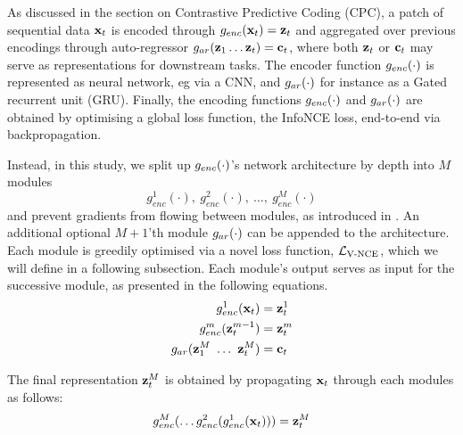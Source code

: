 		
		As discussed in the section on Contrastive Predictive Coding (CPC), a patch of sequential data $\mathbf{x}_t$ is encoded through $g_{enc}(\mathbf{x}_t) = \mathbf{z}_t$ and aggregated over previous encodings through auto-regressor $g_{ar}(\mathbf{z}_1  \dots \mathbf{z}_t) = \mathbf{c}_t$, where both $\mathbf{z}_t$ or $\mathbf{c}_t$ may serve as representations for downstream tasks. The encoder function $g_{enc}(\cdot)$ is represented as neural network, eg via a CNN, and $g_{ar}(\cdot)$ for instance as a Gated recurrent unit (GRU).
		Finally, the encoding functions $g_{enc}(\cdot)$ and $g_{ar}(\cdot)$ are obtained by optimising a global loss function, the InfoNCE loss, end-to-end via backpropagation. 

			Instead, in this study, we split up $g_{enc}(\cdot)$'s network architecture by depth into $M$ modules 
			$$g_{enc}^1(\cdot),~ g_{enc}^2(\cdot),~\dots,~g_{enc}^M(\cdot)$$ 
			and prevent gradients from flowing between modules, as introduced in \cite{lowePuttingEndEndtoEnd2020}. An additional optional $M \! + \! 1$'th module $g_{ar}(\cdot)$ can be appended to the architecture. Each module is greedily optimised via a novel loss function, $\mathcal{L}_{\text{V-NCE}}$, which we will define in a following subsection. Each module's output serves as input for the successive module, as presented in the following equations. %
			\begin{align*} %
				g_{enc}^1(\xt) &= \zt^1 \\
				g_{enc}^m(\zt^{m-1}) &= \zt^m \\
				g_{ar}(\z_1^M ~ \dots ~ \zt^M) &= \ct
			\end{align*}
			
			The final representation $\mathbf{z}_t^M$ is obtained by propagating $\mathbf{x}_t$ through each modules as follows:
			$$ g_{enc}^M ( \dots	g_{enc}^2(g_{enc}^1(\mathbf{x}_t))) = \mathbf{z}_t^M$$
			
			
			
					

